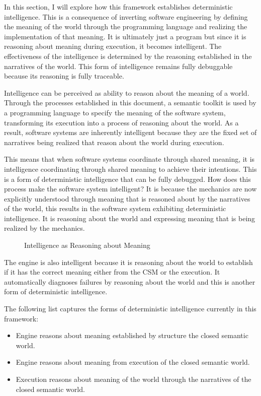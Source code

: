 In this section, I will explore how this framework establishes deterministic intelligence. This is a consequence of inverting software engineering by defining the meaning of the world through the programming language and realizing the implementation of that meaning. It is ultimately just a program but since it is reasoning about meaning during execution, it becomes intelligent. The effectiveness of the intelligence is determined by the reasoning established in the narratives of the world. This form of intelligence remains fully debuggable because its reasoning is fully traceable. 

Intelligence can be perceived as ability to reason about the meaning of a world. Through the processes established in this document, a semantic toolkit is used by a programming language to specify the meaning of the software system, transforming its execution into a process of reasoning about the world. As a result, software systems are inherently intelligent because they are the fixed set of narratives being realized that reason about the world during execution.

This means that when software systems coordinate through shared meaning, it is intelligence coordinating through shared meaning to achieve their intentions. This is a form of deterministic intelligence that can be fully debugged. How does this process make the software system intelligent? It is because the mechanics are now explicitly understood through meaning that is reasoned about by the narratives of the world, this results in the software system exhibiting deterministic intelligence. It is reasoning about the world and expressing meaning that is being realized by the mechanics. 

\begin{figure}[htbp]
    \centering
    
    \caption{Intelligence as Reasoning about Meaning}
    \label{fig:deterministic_intelligence}
\end{figure}

The engine is also intelligent because it is reasoning about the world to establish if it has the correct meaning either from the CSM or the execution. It automatically diagnoses failures by reasoning about the world and this is another form of deterministic intelligence. 

The following list captures the forms of deterministic intelligence currently in this framework:

\begin{itemize}
    \item Engine reasons about meaning established by structure the closed semantic world.
    \item Engine reasons about meaning from execution of the closed semantic world.
    \item Execution reasons about meaning of the world through the narratives of the closed semantic world.
\end{itemize}

